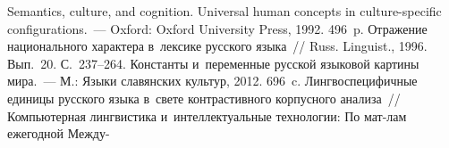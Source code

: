   



\vspace*{-3pt}


 \begin{multicols}{2}

\renewcommand{\bibname}{\protect\rmfamily Литература}

{\small\frenchspacing
{%
\begin{thebibliography}{99}
\vspace*{-3pt}

   Semantics, culture, and cognition. Universal human concepts 
in culture-specific configurations.~--- Oxford: Oxford University Press, 1992. 496~p.
   Отражение национального 
характера в~лексике русского языка~// Russ. Linguist., 1996. Вып.~20. 
С.~237--264.
   Константы 
и~переменные русской языковой картины мира.~--- М.: Языки славянских 
культур, 2012. 696~c.
   Лингвоспецифичные единицы русско\-го языка в~свете 
контрастивного корпусного анализа~// Компьютерная лингвистика 
и~интеллектуальные технологии: По мат-лам ежегодной Между-\linebreak
\vspace*{-12pt}

\pagebreak


\end{thebibliography}}}
\end{multicols}
